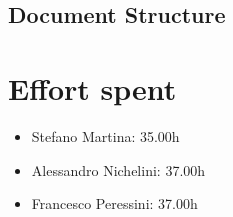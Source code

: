 \documentclass{article}
\begin{document}
\subsection{Document Structure}

\newpage










\newpage
\section{Effort spent}

\begin{itemize}
	\item Stefano Martina: 35.00h
	\item Alessandro Nichelini: 37.00h
	\item Francesco Peressini: 37.00h
\end{itemize}
\end{document}
